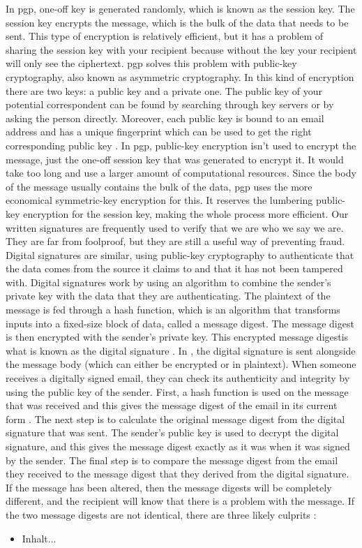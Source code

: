 In \acrshort{pgp}, one-off key is generated randomly, which is known as the session key. The session key encrypts the message, which is the bulk of the data that needs to be sent. This type of encryption is relatively efficient, but it has a problem of sharing the session key with your recipient because without the key your recipient will only see the ciphertext. \acrshort{pgp} solves this problem with public-key cryptography, also known as asymmetric cryptography. In this kind of encryption there are two keys: a public key and a private one. The public key of your potential correspondent can be found by searching through key servers or by asking the person directly. Moreover, each public key is bound to an \acrshort{email} address and has a unique fingerprint which can be used to get the right corresponding public key \cite{5}. In \acrshort{pgp}, public-key encryption isn’t used to encrypt the message, just the one-off session key that was generated to encrypt it. It would take too long and use a larger amount of computational resources. Since the body of the message usually contains the bulk of the data, \acrshort{pgp} uses the more economical symmetric-key encryption for this. It reserves the lumbering public-key encryption for the session key, making the whole process more efficient. Our written signatures are frequently used to verify that we are who we say we are. They are far from foolproof, but they are still a useful way of preventing fraud.
\newline
Digital signatures are similar, using public-key cryptography to authenticate that the data comes from the source it claims to and that it has not been tampered with. Digital signatures work by using an algorithm to combine the sender’s private key with the data that they are authenticating. The plaintext of the message is fed through a hash function, which is an algorithm that transforms inputs into a fixed-size block of data, called a message digest. The message digest is then encrypted with the sender’s private key. This encrypted message digestis what is known as the digital signature \cite{6}. In \cite{pgp}, the digital signature is sent alongside the message body (which can either be encrypted or in plaintext). When someone receives a digitally signed \acrfull{email}, they can check its authenticity and integrity by using the public key of the sender. First, a hash function is used on the message that was received and this gives the message digest of the email in its current form \cite{6}. The next step is to calculate the original message digest from the digital signature that was sent. The sender’s public key is used to
decrypt the digital signature, and this gives the message digest exactly as it was when it was signed by the sender. The final step is to compare the message digest from the email they received to the message digest that they derived from the digital signature. If the message has been altered, then the message digests will be completely different, and the recipient will know that there is a problem with the message. If the two message digests are not identical, there are three likely culprits \cite{6}:
\newline
\begin{itemize}
	\item
	Inhalt...
\end{itemize}